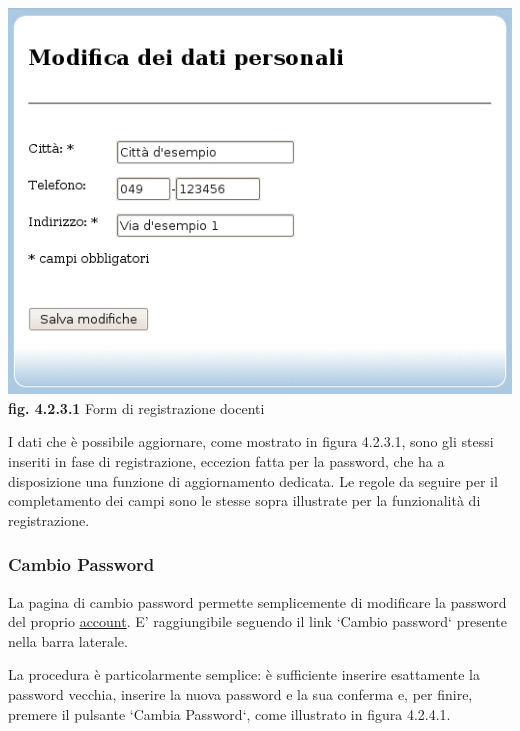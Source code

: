 \documentclass[11pt,a4paper]{article}
\begin{document}
\begin{center}
	\includegraphics[scale=0.5]{images/dati_personali.jpg}\\ 
	\textbf{fig. 4.2.3.1} Form di registrazione docenti\\
\end{center}
\bigskip

I dati che è possibile aggiornare, come mostrato in figura 4.2.3.1, sono gli stessi inseriti in fase di registrazione, eccezion fatta per la password, che ha a disposizione una funzione di aggiornamento dedicata. Le regole da seguire per il completamento dei campi sono le stesse sopra illustrate per la funzionalità di registrazione.
\subsubsection{Cambio Password}
La pagina di cambio password permette semplicemente di modificare la password del proprio \underline{account}. E' raggiungibile seguendo il link `Cambio password` presente nella barra laterale.

La procedura è particolarmente semplice: è sufficiente inserire esattamente la password vecchia, inserire la nuova password e la sua conferma e, per finire, premere il pulsante `Cambia Password`, come illustrato in figura 4.2.4.1.
\end{document}
